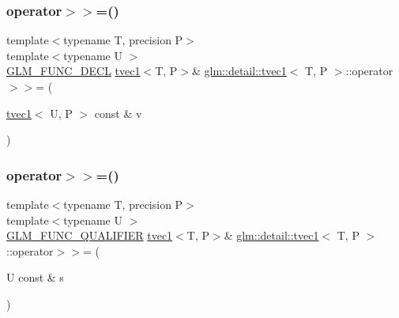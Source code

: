 \mbox{\label{structglm_1_1detail_1_1tvec1_a9cbcbbf300a0197e674bc97e277f9683}} 
\subsubsection{\texorpdfstring{operator$>$$>$=()}{operator>>=()}\hspace{0.1cm}{\footnotesize\ttfamily [2/4]}}
{\footnotesize\ttfamily template$<$typename T, precision P$>$ \\
template$<$typename U $>$ \\
\hyperlink{setup_8hpp_ab2d052de21a70539923e9bcbf6e83a51}{G\+L\+M\+\_\+\+F\+U\+N\+C\+\_\+\+D\+E\+CL} \hyperlink{structglm_1_1detail_1_1tvec1}{tvec1}$<$T, P$>$\& \hyperlink{structglm_1_1detail_1_1tvec1}{glm\+::detail\+::tvec1}$<$ T, P $>$\+::operator$>$$>$= (\begin{DoxyParamCaption}\item[{\hyperlink{structglm_1_1detail_1_1tvec1}{tvec1}$<$ U, P $>$ const \&}]{v }\end{DoxyParamCaption})}

\mbox{\label{structglm_1_1detail_1_1tvec1_a9f9d23540183bc4baa3b01052f61e0f9}} 
\subsubsection{\texorpdfstring{operator$>$$>$=()}{operator>>=()}\hspace{0.1cm}{\footnotesize\ttfamily [3/4]}}
{\footnotesize\ttfamily template$<$typename T, precision P$>$ \\
template$<$typename U $>$ \\
\hyperlink{setup_8hpp_a33fdea6f91c5f834105f7415e2a64407}{G\+L\+M\+\_\+\+F\+U\+N\+C\+\_\+\+Q\+U\+A\+L\+I\+F\+I\+ER} \hyperlink{structglm_1_1detail_1_1tvec1}{tvec1}$<$T, P$>$\& \hyperlink{structglm_1_1detail_1_1tvec1}{glm\+::detail\+::tvec1}$<$ T, P $>$\+::operator$>$$>$= (\begin{DoxyParamCaption}\item[{U const \&}]{s }\end{DoxyParamCaption})}



